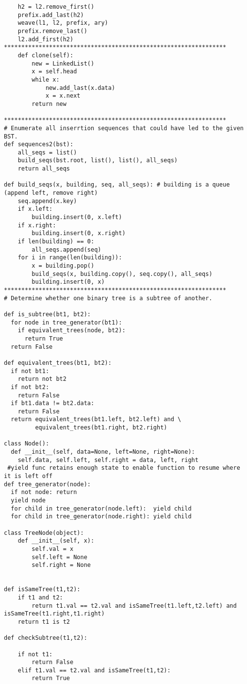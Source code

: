 \documentclass[12pt]{article}
\begin{document}
\begin{lstlisting}
    h2 = l2.remove_first()
    prefix.add_last(h2)
    weave(l1, l2, prefix, ary)
    prefix.remove_last()
    l2.add_first(h2)
****************************************************************
    def clone(self):
        new = LinkedList()
        x = self.head
        while x:
            new.add_last(x.data)
            x = x.next
        return new

****************************************************************
# Enumerate all inserrtion sequences that could have led to the given BST.
def sequences2(bst):
    all_seqs = list()
    build_seqs(bst.root, list(), list(), all_seqs)
    return all_seqs

def build_seqs(x, building, seq, all_seqs): # building is a queue (append left, remove right)
    seq.append(x.key)
    if x.left:
        building.insert(0, x.left)
    if x.right:
        building.insert(0, x.right)
    if len(building) == 0:
        all_seqs.append(seq)
    for i in range(len(building)):
        x = building.pop()
        build_seqs(x, building.copy(), seq.copy(), all_seqs)
        building.insert(0, x)
****************************************************************
# Determine whether one binary tree is a subtree of another.

def is_subtree(bt1, bt2):
  for node in tree_generator(bt1):
    if equivalent_trees(node, bt2):
      return True
  return False

def equivalent_trees(bt1, bt2):
  if not bt1:
    return not bt2
  if not bt2:
    return False
  if bt1.data != bt2.data:
    return False
  return equivalent_trees(bt1.left, bt2.left) and \
         equivalent_trees(bt1.right, bt2.right)

class Node():
  def __init__(self, data=None, left=None, right=None):
    self.data, self.left, self.right = data, left, right
 #yield func retains enough state to enable function to resume where it is left off   
def tree_generator(node):
  if not node: return
  yield node
  for child in tree_generator(node.left):  yield child
  for child in tree_generator(node.right): yield child

class TreeNode(object):
	def __init__(self, x):
		self.val = x
		self.left = None
		self.right = None


def isSameTree(t1,t2):
	if t1 and t2:
		return t1.val == t2.val and isSameTree(t1.left,t2.left) and isSameTree(t1.right,t1.right)
	return t1 is t2

def checkSubtree(t1,t2):

	if not t1:
		return False
	elif t1.val == t2.val and isSameTree(t1,t2):
		return True


\end{lstlisting}
\end{document}
